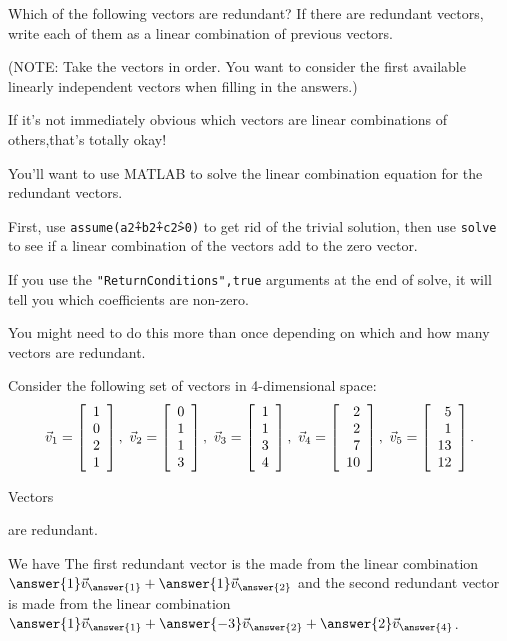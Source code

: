 \documentclass{ximera}
\author{Zack Reed}
\begin{document}
\begin{exercise}

    Which of the following vectors are redundant? If there are redundant
vectors, write each of them as a linear combination of previous
vectors.

(NOTE: Take the vectors in order. You want to consider the first available linearly independent vectors when filling in the answers.)

\begin{hint}

    If it's not immediately obvious which vectors are linear combinations of others,that's totally okay! 
    
    You'll want to use MATLAB to solve the linear combination equation for the redundant vectors.

    First, use \texttt{assume(a\^2+b\^2+c\^2>0)} to get rid of the trivial solution, then use \texttt{solve} to see if a linear combination of the vectors add to the zero vector.

    If you use the \texttt{"ReturnConditions",true} arguments at the end of solve, it will tell you which coefficients are non-zero. 

    You might need to do this more than once depending on which and how many vectors are redundant.

\end{hint}
Consider the following set of vectors in 4-dimensional space:
\[
\vect{v}_1 = \startmat{r} 1 \\ 0 \\ 2 \\ 1 \stopmat,\quad
\vect{v}_2 = \startmat{r} 0 \\ 1 \\ 1 \\ 3 \stopmat,\quad
\vect{v}_3 = \startmat{r} 1 \\ 1 \\ 3 \\ 4 \stopmat,\quad
\vect{v}_4 = \startmat{r} 2 \\ 2 \\ 7 \\ 10 \stopmat,\quad
\vect{v}_5 = \startmat{r} 5 \\ 1 \\ 13 \\ 12 \stopmat.
\]


Vectors \begin{selectAll}
\end{selectAll} are redundant.

We have
The first redundant vector is the made from the linear combination $\answer{1}\vect{v}_{\answer{1}}+\answer{1}\vect{v}_{\answer{2}}$ and the second redundant vector is made from the linear combination $\answer{1}\vect{v}_{\answer{1}}+\answer{-3}\vect{v}_{\answer{2}}+\answer{2}\vect{v}_{\answer{4}}$.


\end{exercise}
\end{document}
